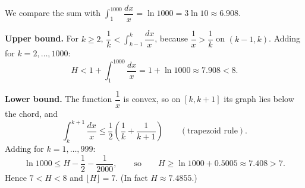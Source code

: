We compare the sum with $\displaystyle\int_1^{1000}\dfrac{dx}{x}=\ln1000=3\ln10\approx6.908$.

\textbf{Upper bound.} For $k\ge2$, $\dfrac{1}{k}<\displaystyle\int_{k-1}^{k}\dfrac{dx}{x}$, because $\dfrac{1}{x}>\dfrac{1}{k}$ on $(k-1,k)$. Adding for $k=2,\dots,1000$:
\[
H<1+\int_1^{1000}\dfrac{dx}{x}=1+\ln1000\approx7.908<8 .
\]

\textbf{Lower bound.} The function $\dfrac{1}{x}$ is convex, so on $[k,k+1]$ its graph lies below the chord, and
\[
\int_k^{k+1}\dfrac{dx}{x}\le\dfrac{1}{2}\left(\dfrac{1}{k}+\dfrac{1}{k+1}\right)\qquad(\text{trapezoid rule}).
\]
Adding for $k=1,\dots,999$:
\[
\ln1000\le H-\dfrac{1}{2}-\dfrac{1}{2000},\qquad\text{so}\qquad H\ge\ln1000+0.5005\approx7.408>7 .
\]
Hence $7<H<8$ and $\lfloor H\rfloor=\boxed{7}$. (In fact $H\approx7.4855$.)
